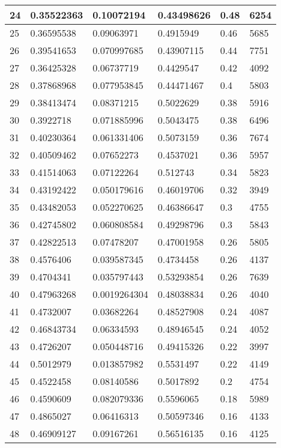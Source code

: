 \begin{longtable}{|l|l|l|l|l|l|}
24 & 0.35522363 & 0.10072194 & 0.43498626 & 0.48 & 6254 \\ \hline 
25 & 0.36595538 & 0.09063971 & 0.4915949 & 0.46 & 5685 \\ \hline 
26 & 0.39541653 & 0.070997685 & 0.43907115 & 0.44 & 7751 \\ \hline 
27 & 0.36425328 & 0.06737719 & 0.4429547 & 0.42 & 4092 \\ \hline 
28 & 0.37868968 & 0.077953845 & 0.44471467 & 0.4 & 5803 \\ \hline 
29 & 0.38413474 & 0.08371215 & 0.5022629 & 0.38 & 5916 \\ \hline 
30 & 0.3922718 & 0.071885996 & 0.5043475 & 0.38 & 6496 \\ \hline 
31 & 0.40230364 & 0.061331406 & 0.5073159 & 0.36 & 7674 \\ \hline 
32 & 0.40509462 & 0.07652273 & 0.4537021 & 0.36 & 5957 \\ \hline 
33 & 0.41514063 & 0.07122264 & 0.512743 & 0.34 & 5823 \\ \hline 
34 & 0.43192422 & 0.050179616 & 0.46019706 & 0.32 & 3949 \\ \hline 
35 & 0.43482053 & 0.052270625 & 0.46386647 & 0.3 & 4755 \\ \hline 
36 & 0.42745802 & 0.060808584 & 0.49298796 & 0.3 & 5843 \\ \hline 
37 & 0.42822513 & 0.07478207 & 0.47001958 & 0.26 & 5805 \\ \hline 
38 & 0.4576406 & 0.039587345 & 0.4734458 & 0.26 & 4137 \\ \hline 
39 & 0.4704341 & 0.035797443 & 0.53293854 & 0.26 & 7639 \\ \hline 
40 & 0.47963268 & 0.0019264304 & 0.48038834 & 0.26 & 4040 \\ \hline 
41 & 0.4732007 & 0.03682264 & 0.48527908 & 0.24 & 4087 \\ \hline 
42 & 0.46843734 & 0.06334593 & 0.48946545 & 0.24 & 4052 \\ \hline 
43 & 0.4726207 & 0.050448716 & 0.49415326 & 0.22 & 3997 \\ \hline 
44 & 0.5012979 & 0.013857982 & 0.5531497 & 0.22 & 4149 \\ \hline 
45 & 0.4522458 & 0.08140586 & 0.5017892 & 0.2 & 4754 \\ \hline 
46 & 0.4590609 & 0.082079336 & 0.5596065 & 0.18 & 5989 \\ \hline 
47 & 0.4865027 & 0.06416313 & 0.50597346 & 0.16 & 4133 \\ \hline 
48 & 0.46909127 & 0.09167261 & 0.56516135 & 0.16 & 4125 \\ \hline 

\end{longtable}
